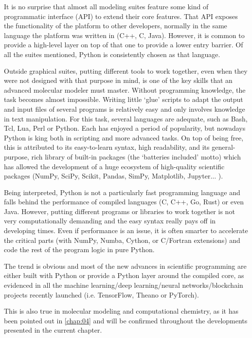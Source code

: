 It is no surprise that almost all modeling suites feature some kind of programmatic interface (API) to extend their core features. That API exposes the functionality of the platform to other developers, normally in the same language the platform was written in (C++, C, Java). However, it is common to provide a high-level layer on top of that one to provide a lower entry barrier. Of all the suites mentioned, Python is consistently chosen as that language.

Outside graphical suites, putting different tools to work together, even when they were not designed with that purpose in mind, is one of the key skills that an advanced molecular modeler must master. Without programming knowledge, the task becomes almost impossible. Writing little ‘glue’ scripts to adapt the output and input files of several programs is relatively easy and only involves knowledge in text manipulation. For this task, several languages are adequate, such as Bash, Tcl, Lua, Perl or Python. Each has enjoyed a period of popularity, but nowadays Python is king both in scripting and more advanced tasks. On top of being free, this is attributed to its easy-to-learn syntax, high readability, and its general-purpose, rich library of built-in packages (the ‘batteries included’ motto) which has allowed the development of a huge ecosystem of high-quality scientific packages (NumPy, SciPy, Scikit, Pandas, SimPy, Matplotlib, Jupyter$ \ldots $ ).

Being interpreted, Python is not a particularly fast programming language and falls behind the performance of compiled languages (C, C++, Go, Rust) or even Java. However, putting different programs or libraries to work together is not very computationally demanding and the easy syntax really pays off in developing times. Even if performance is an issue, it is often smarter to accelerate the critical parts (with NumPy,\cite{numpy} Numba,\cite{numba} Cython,\cite{cython} or C/Fortran extensions) and code the rest of the program logic in pure Python.

The trend is obvious and most of the new advances in scientific programming are either built with Python or provide a Python layer around the compiled core, as evidenced in all the machine learning/deep learning/neural networks/blockchain projects recently launched (i.e. TensorFlow,\cite{tensorflow} Theano\cite{theano} or PyTorch\cite{pytorch}).

This is also true in molecular modeling and computational chemistry, as it has been pointed out in \autoref{chap:04} and will be confirmed throughout the developments presented in the current chapter.

